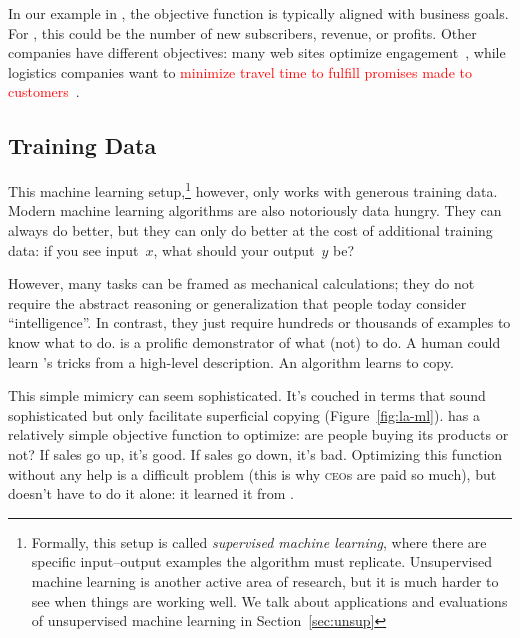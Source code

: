 In our example in \crunchyCity{}, the objective function is typically
aligned with business goals.
%
For \energyCompany{}, this could be the number of new subscribers,
revenue, or profits.
%
Other companies have different objectives: many web sites optimize
engagement~\citep{hoiles-17}, while logistics companies want to
\textcolor{red}{minimize travel time to fulfill promises made to customers}~\citep{fiat-16}.

\subsection{Training Data}

This machine learning setup,\footnote{Formally, this setup is called
  \emph{supervised machine learning}, where there are specific
  input--output examples the algorithm must replicate.  Unsupervised
  machine learning is another active area of research, but it is much
  harder to see when things are working well.  We talk about
  applications and evaluations of unsupervised machine learning in
  Section~\ref{sec:unsup}} however, only works with generous training
data.  Modern machine learning algorithms are also notoriously data
hungry.  They can always do better, but they can only do better at the
cost of additional training data: if you see input~$x$, what should
your output~$y$ be?

However, many tasks can be framed as mechanical calculations; they
do not require the abstract reasoning or generalization that people today
consider ``intelligence''.  In contrast, they just require hundreds
or thousands of examples to know what to do.  \energyJerk{} is a
prolific demonstrator of what (not) to do.  A human could learn
\energyJerk{}'s tricks from a high-level description.  An algorithm
learns to copy. 

This simple mimicry can seem sophisticated.  It's couched in terms
that sound sophisticated but only facilitate superficial copying
(Figure~\ref{fig:la-ml}).  \energyCompany{} has a relatively simple
objective function to optimize: are people buying its
products or not?  If sales go up, it's good.  If sales go down, it's
bad.  Optimizing this function without any help is a difficult problem
(this is why \textsc{ceo}s are paid so much), but \energyCompany{}
doesn't have to do it alone: it learned it from \energyJerk{}.

